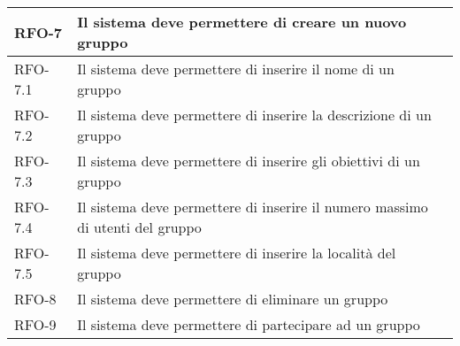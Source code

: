 \begin{center}
{\begin{longtable}{
      |>{\centering\arraybackslash}p{60pt}
      |>{\centering\arraybackslash}p{220pt}
      |>{\centering\arraybackslash}p{60pt}|}
      RFO-7                                                                & Il
      sistema deve permettere di creare un nuovo gruppo                    &
      \nameref{uc:scenario-creazione-nuovo-gruppo}
      \\
      \hline

      RFO-7.1                                                              & Il
      sistema deve permettere di inserire il nome di un
      gruppo                                                               &
      \nameref{sub:inserimento-nome-gruppo}                                     \\
      \hline

      RFO-7.2                                                              & Il
      sistema deve permettere di inserire la descrizione di
      un gruppo                                                            &
      \nameref{sub:inserimento-descrizione-gruppo}                              \\
      \hline

      RFO-7.3                                                              & Il
      sistema deve permettere di inserire gli obiettivi di
      un gruppo                                                            &
      \nameref{sub:inserimento-obiettivi-gruppo}                                \\
      \hline

      RFO-7.4                                                              & Il
      sistema deve permettere di inserire il numero massimo
      di utenti del gruppo                                                 &
      \nameref{sub:inserimento-numero-utenti-gruppo}                            \\
      \hline

      RFO-7.5                                                              & Il
      sistema deve permettere di inserire la località del
      gruppo                                                               &
      \nameref{sub:inserimento-località-gruppo}                                 \\
      \hline

      RFO-8                                                                & Il
      sistema deve permettere di eliminare un gruppo                       &
      \nameref{uc:scenario-elimina-gruppo}
      \\
      \hline

      RFO-9                                                                & Il
      sistema deve permettere di partecipare ad un gruppo                  &
      \nameref{uc:scenario-partecipa-gruppo}
      \\
      \hline


\end{longtable}}
\end{center}
